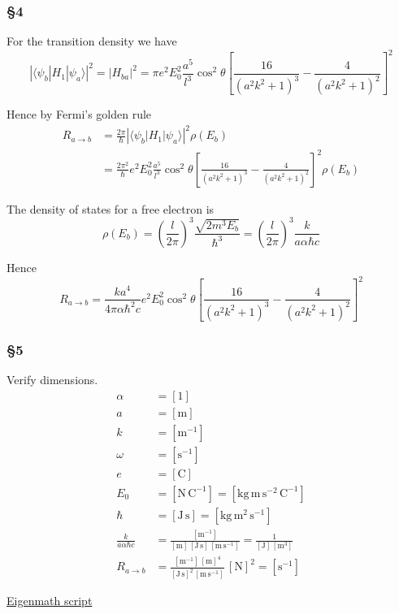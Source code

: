 \subsubsection*{\S4}

For the transition density we have
\begin{equation*}
|\langle\psi_b|H_1|\psi_a\rangle|^2=|H_{ba}|^2
=\pi e^2E_0^2
\frac{a^5}{l^3}\cos^2\theta
\left[\frac{16}{(a^2k^2+1)^3}-\frac{4}{(a^2k^2+1)^2}\right]^2
\tag{6}
\end{equation*}

Hence by Fermi's golden rule
\begin{align*}
R_{a\rightarrow b}&=\frac{2\pi}{\hbar}\left|\langle\psi_b|H_1|\psi_a\rangle\right|^2\rho(E_b)
\\[1ex]
&=\frac{2\pi^2}{\hbar}e^2E_0^2
\frac{a^5}{l^3}\cos^2\theta
\left[\frac{16}{(a^2k^2+1)^3}-\frac{4}{(a^2k^2+1)^2}\right]^2
\rho(E_b)
\end{align*}

The density of states for a free electron is
\begin{equation*}
\rho(E_b)
=\left(\frac{l}{2\pi}\right)^3
\frac{\sqrt{2m^3E_b}}{\hbar^3}
=\left(\frac{l}{2\pi}\right)^3
\frac{k}{a\alpha\hbar c}
\tag{7}
\end{equation*}

Hence
\begin{equation*}
R_{a\rightarrow b}
=\frac{ka^4}{4\pi\alpha\hbar^2c}
e^2E_0^2
\cos^2\theta
\left[\frac{16}{(a^2k^2+1)^3}-\frac{4}{(a^2k^2+1)^2}\right]^2
\tag{8}
\end{equation*}

\subsubsection*{\S5}

Verify dimensions.
\begin{align*}
\alpha&=[1]
\\
a&=[\text{m}]
\\
k&=[\text{m}^{-1}]
\\
\omega&=[\text{s}^{-1}]
\\
e&=[\text{C}]
\\
E_0&=[\text{N}\,\text{C}^{-1}]=[\text{kg}\,\text{m}\,\text{s}^{-2}\,\text{C}^{-1}]
\\
\hbar&=[\text{J}\,\text{s}]=[\text{kg}\,\text{m}^2\,\text{s}^{-1}]
\\[1ex]
\frac{k}{a\alpha\hbar c}
&=\frac{[\text{m}^{-1}]}{[\text{m}]\,[\text{J}\,\text{s}]\,[\text{m}\,\text{s}^{-1}]}
=\frac{1}{[\text{J}]\,[\text{m}^3]}
\\[1ex]
R_{a\rightarrow b}
&=\frac{[\text{m}^{-1}]\,[\text{m}]^4}{[\text{J}\,\text{s}]^2
\,[\text{m}\,\text{s}^{-1}]}
\,[\text{N}]^2
=[\text{s}^{-1}]
\tag{9}
\end{align*}

\href{https://georgeweigt.github.io/examples/photoelectric-effect-demo.html}{Eigenmath script}


